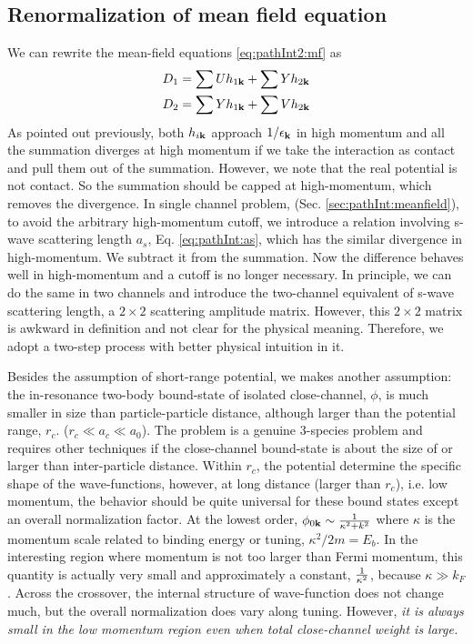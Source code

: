 \subsection {Renormalization of mean field equation}
We can rewrite the mean-field equations \ref{eq:pathInt2:mf} as 
\begin{align}
D_{1}&=\sum{}Uh_{1\mathbf{k}}+\sum{}Yh_{2\mathbf{k}}\label{eq:pathInt2:mfopen}\\
D_{2}&=\sum{}Yh_{1\mathbf{k}}+\sum{}Vh_{2\mathbf{k}}\label{eq:pathInt2:mfclose}
\end{align}
As pointed out previously, both $h_{i\mathbf{k}}$ approach $1/\epsilon_{\mathbf{k}}$ in high momentum and all the summation diverges at high momentum if we take the interaction as contact and pull them out of the summation.  However, we note that the real potential is not contact.  So the summation should be capped at high-momentum, which removes the divergence.  In single channel problem, (Sec. \ref{sec:pathInt:meanfield}), to avoid the arbitrary high-momentum cutoff, we  introduce a relation involving s-wave scattering length $a_{s}$, Eq. \eqref{eq:pathInt:as}, which has the similar divergence in high-momentum.  We subtract it from the summation.  Now the difference behaves well in high-momentum and a cutoff is no longer necessary.  In principle, we can do the same in two channels and introduce the two-channel equivalent of s-wave scattering length, a $2\times2$ scattering amplitude matrix.  However, this $2\times2$ matrix is awkward in definition and not clear for the physical meaning.   Therefore, we adopt a two-step process with better physical intuition in it.   


 Besides the assumption of short-range potential, we makes another assumption:  the in-resonance two-body bound-state of isolated close-channel, $\phi$, is much smaller in size than particle-particle distance, although larger than the potential range, $r_{c}$.     ($r_{c}\ll{}a_{c}\ll{}a_{0}$).  The problem is a genuine 3-species problem and requires other techniques if the close-channel bound-state is about the size of or larger than  inter-particle distance. Within $r_{c}$, the  potential determine the specific shape of the wave-functions, however, at long distance (larger than $r_{c}$), i.e. low momentum, the behavior should be quite universal for these bound states except an overall normalization factor.  At the lowest order, $\phi_{0\mathbf{k}}\sim\frac{1}{\kappa^{2}+k^{2}}$ where $\kappa$ is the momentum scale related to binding energy or tuning, $\kappa^{2}/2m=E_{b}$.   In the interesting region where momentum is not too larger than Fermi momentum, this quantity is actually very small and approximately a constant, $\frac{1}{\kappa^{2}}$, because $\kappa{}\gg{}k_{F}$.  Across the crossover, the internal structure of wave-function does not change much, but the overall normalization does vary along tuning.  However, \emph{it is always small in the low momentum region  even when total close-channel weight is large.}
 
